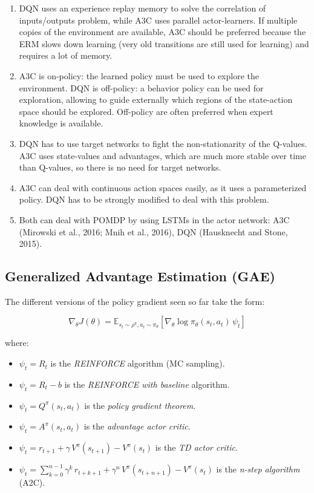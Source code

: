 \documentclass[
  letterpaper,
  DIV=11,
  numbers=noendperiod]{scrreprt}
\providecommand{\tightlist}{%
  \setlength{\itemsep}{0pt}\setlength{\parskip}{0pt}}\usepackage{longtable,booktabs,array}
\begin{document}
\begin{enumerate}
\def\labelenumi{\arabic{enumi}.}
\tightlist
\item
  DQN uses an experience replay memory to solve the correlation of
  inputs/outputs problem, while A3C uses parallel actor-learners. If
  multiple copies of the environment are available, A3C should be
  preferred because the ERM slows down learning (very old transitions
  are still used for learning) and requires a lot of memory.
\item
  A3C is on-policy: the learned policy must be used to explore the
  environment. DQN is off-policy: a behavior policy can be used for
  exploration, allowing to guide externally which regions of the
  state-action space should be explored. Off-policy are often preferred
  when expert knowledge is available.
\item
  DQN has to use target networks to fight the non-stationarity of the
  Q-values. A3C uses state-values and advantages, which are much more
  stable over time than Q-values, so there is no need for target
  networks.
\item
  A3C can deal with continuous action spaces easily, as it uses a
  parameterized policy. DQN has to be strongly modified to deal with
  this problem.
\item
  Both can deal with POMDP by using LSTMs in the actor network: A3C
  (Mirowski et al., 2016; Mnih et al., 2016), DQN (Hausknecht and Stone,
  2015).
\end{enumerate}

\hypertarget{generalized-advantage-estimation-gae}{%
\subsection{Generalized Advantage Estimation
(GAE)}\label{generalized-advantage-estimation-gae}}

The different versions of the policy gradient seen so far take the form:

\[
    \nabla_\theta J(\theta) =  \mathbb{E}_{s_t \sim \rho^\pi, a_t \sim \pi_\theta}[\nabla_\theta \log \pi_\theta (s_t, a_t) \, \psi_t ]
\]

where:

\begin{itemize}
\item
  \(\psi_t = R_t\) is the \emph{REINFORCE} algorithm (MC sampling).
\item
  \(\psi_t = R_t - b\) is the \emph{REINFORCE with baseline} algorithm.
\item
  \(\psi_t = Q^\pi(s_t, a_t)\) is the \emph{policy gradient theorem}.
\item
  \(\psi_t = A^\pi(s_t, a_t)\) is the \emph{advantage actor critic}.
\item
  \(\psi_t = r_{t+1} + \gamma \, V^\pi(s_{t+1}) - V^\pi(s_t)\) is the
  \emph{TD actor critic}.
\item
  \(\psi_t = \sum_{k=0}^{n-1} \gamma^{k} \, r_{t+k+1} + \gamma^n \, V^\pi(s_{t+n+1}) - V^\pi(s_t)\)
  is the \emph{n-step algorithm} (A2C).
\end{itemize}
\end{document}
